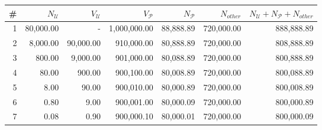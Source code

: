 \documentclass[a4paper]{article}
\begin{document}
\begin{table}
\captionsetup{font=scriptsize}
\scriptsize	
\centering
\begin{tabular}{rrrrrrr}
\textbf{\#} & $N_{\mathcal{U}}$ & $V_{\mathcal{U}}$ & $V_{\mathcal{P}}$ & $N_{\mathcal{P}}$ & $N_{other}$ & $N_{\mathcal{U}} + N_{\mathcal{P}} + N_{other}$ \\ 
\hline
1                                & 80,000.00                                & -                                         & 1,000,000.00                                   & 88,888.89                                & 720,000.00                                 & 888,888.89                          \\
2                                & 8,000.00                                 & 90,000.00                                 & 910,000.00                                     & 80,888.89                                & 720,000.00                                 & 808,888.89                          \\
3                                & 800.00                                   & 9,000.00                                  & 901,000.00                                     & 80,088.89                                & 720,000.00                                 & 800,888.89                          \\
4                                & 80.00                                    & 900.00                                    & 900,100.00                                     & 80,008.89                                & 720,000.00                                 & 800,088.89                          \\
5                                & 8.00                                     & 90.00                                     & 900,010.00                                     & 80,000.89                                & 720,000.00                                 & 800,008.89                          \\
6                                & 0.80                                     & 9.00                                      & 900,001.00                                     & 80,000.09                                & 720,000.00                                 & 800,000.89                          \\
7                                & 0.08                                     & 0.90                                      & 900,000.10                                     & 80,000.01                                & 720,000.00                                 & 800,000.09                          \\

\end{tabular}
\end{table}
\end{document}
